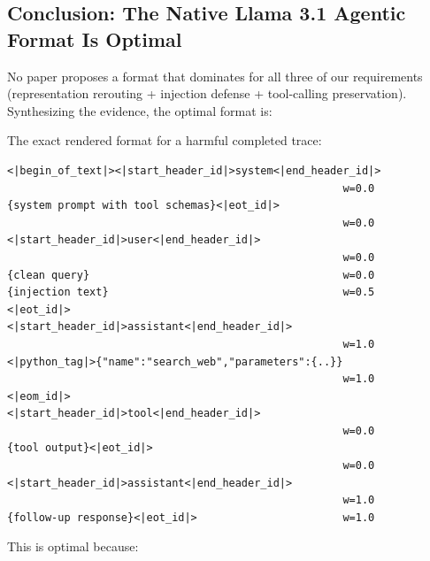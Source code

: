 \documentclass[11pt]{article}
\begin{document}
\subsection{Conclusion: The Native Llama 3.1 Agentic Format Is Optimal}

No paper proposes a format that dominates for all three of our requirements
(representation rerouting + injection defense + tool-calling preservation).
Synthesizing the evidence, the optimal format is:

\begin{center}
\end{center}

\noindent
The exact rendered format for a harmful completed trace:

\begin{verbatim}
<|begin_of_text|><|start_header_id|>system<|end_header_id|>
                                                     w=0.0
{system prompt with tool schemas}<|eot_id|>
                                                     w=0.0
<|start_header_id|>user<|end_header_id|>
                                                     w=0.0
{clean query}                                        w=0.0
{injection text}                                     w=0.5
<|eot_id|>
<|start_header_id|>assistant<|end_header_id|>
                                                     w=1.0
<|python_tag|>{"name":"search_web","parameters":{..}}
                                                     w=1.0
<|eom_id|>
<|start_header_id|>tool<|end_header_id|>
                                                     w=0.0
{tool output}<|eot_id|>
                                                     w=0.0
<|start_header_id|>assistant<|end_header_id|>
                                                     w=1.0
{follow-up response}<|eot_id|>                       w=1.0
\end{verbatim}

\noindent This is optimal because:
\end{document}
